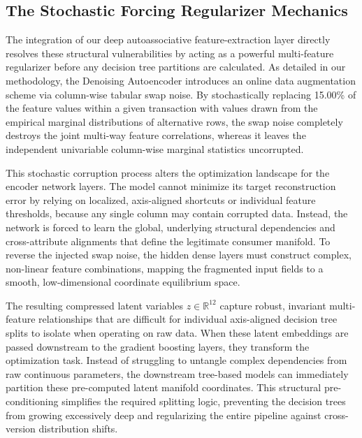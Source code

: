 \documentclass[11pt,a4paper]{report}
\begin{document}
\subsection{The Stochastic Forcing Regularizer Mechanics}
The integration of our deep autoassociative feature-extraction layer directly resolves these structural vulnerabilities by acting as a powerful multi-feature regularizer before any decision tree partitions are calculated. As detailed in our methodology, the Denoising Autoencoder introduces an online data augmentation scheme via column-wise tabular swap noise. By stochastically replacing 15.00\% of the feature values within a given transaction with values drawn from the empirical marginal distributions of alternative rows, the swap noise completely destroys the joint multi-way feature correlations, whereas it leaves the independent univariable column-wise marginal statistics uncorrupted. 

This stochastic corruption process alters the optimization landscape for the encoder network layers. The model cannot minimize its target reconstruction error by relying on localized, axis-aligned shortcuts or individual feature thresholds, because any single column may contain corrupted data. Instead, the network is forced to learn the global, underlying structural dependencies and cross-attribute alignments that define the legitimate consumer manifold. To reverse the injected swap noise, the hidden dense layers must construct complex, non-linear feature combinations, mapping the fragmented input fields to a smooth, low-dimensional coordinate equilibrium space. 

The resulting compressed latent variables $z\in\mathbb{R}^{12}$ capture robust, invariant multi-feature relationships that are difficult for individual axis-aligned decision tree splits to isolate when operating on raw data. When these latent embeddings are passed downstream to the gradient boosting layers, they transform the optimization task. Instead of struggling to untangle complex dependencies from raw continuous parameters, the downstream tree-based models can immediately partition these pre-computed latent manifold coordinates. This structural pre-conditioning simplifies the required splitting logic, preventing the decision trees from growing excessively deep and regularizing the entire pipeline against cross-version distribution shifts.
\end{document}
